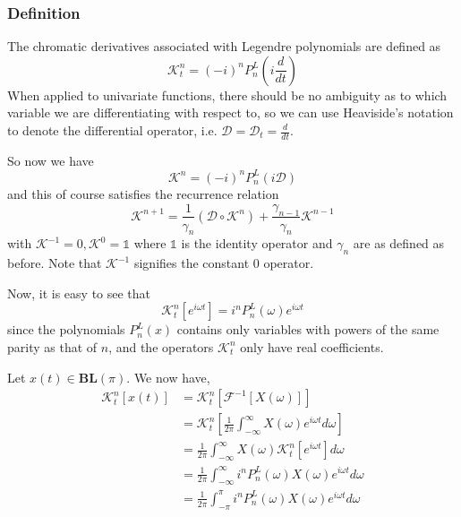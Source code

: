 \documentclass[11pt,oneside]{book}
\theoremstyle{plain}
\theoremstyle{definition}
\theoremstyle{remark}
\begin{document}
\subsubsection{Definition} \label{cd_def}

The chromatic derivatives associated with Legendre polynomials are defined as
\begin{equation}
  \mathcal{K}_t^n = (-i)^n P_n^L \left (i \frac{d}{dt} \right )
\end{equation} 
When applied to univariate functions, there should be no ambiguity as to
which variable we are differentiating with respect to, so we can use Heaviside's
notation to denote the differential operator, i.e. $\mathcal{D} = \mathcal{D}_t 
= \frac{d}{dt}$. 

So now we have
\begin{equation}
  \mathcal{K}^n = (-i)^n P_n^L \left (i \mathcal{D} \right )
\end{equation}
and this of course satisfies the recurrence relation
\begin{equation}
  \mathcal{K}^{n+1} = \frac{1}{\gamma_n} \left ( \mathcal{D} \circ \mathcal{K}^n \right ) 
                        + \frac{\gamma_{n-1}}{\gamma_n} \mathcal{K}^{n-1}
\end{equation}
with $\mathcal{K}^{-1} = 0, \mathcal{K}^0 = \mathds{1}$ where $\mathds{1}$ is 
the identity operator and $\gamma_n$ are as defined as before. Note that 
$\mathcal{K}^{-1}$ signifies the constant 0 operator.

Now, it is easy to see that
\begin{equation}
  \mathcal{K}_t^n[e^{i\omega t}] = i^n P_n^L(\omega) e^{i\omega t}
\end{equation}
since the polynomials $P_n^L(x)$ contains only variables with powers of the same
parity as that of $n$, and the operators $\mathcal{K}_t^n$ only have real coefficients.

Let $x(t) \in \mathbf{BL}(\pi)$. We now have,
\begin{align*}
  \mathcal{K}_t^n[x(t)]
    &= \mathcal{K}_t^n[\mathcal{F}^{-1}[X(\omega)]] \\
    &= \mathcal{K}_t^n \left [ \frac{1}{2 \pi} \int_{-\infty}^{\infty} X(\omega) e^{i \omega t} d\omega \right ] \\
    &= \frac{1}{2 \pi} \int_{-\infty}^{\infty} X(\omega) \mathcal{K}_t^n[e^{i \omega t}] d\omega \\
    &= \frac{1}{2 \pi} \int_{-\infty}^{\infty} i^n P_n^L(\omega) X(\omega) e^{i\omega t} d\omega \\
    &= \frac{1}{2 \pi} \int_{-\pi}^{\pi} i^n P_n^L(\omega) X(\omega) e^{i\omega t} d\omega \\
\end{align*}
\end{document}
